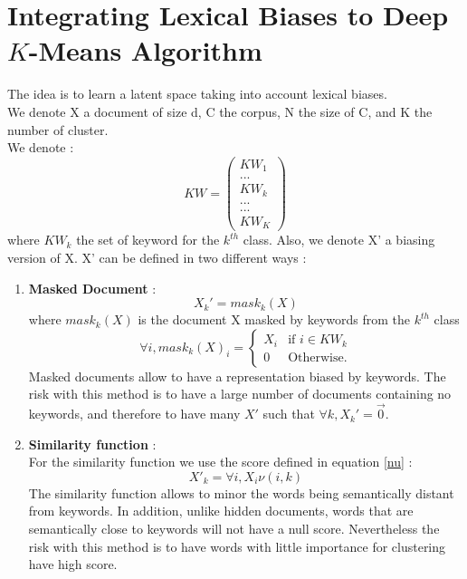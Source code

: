 \section{Integrating Lexical Biases to Deep $K$-Means Algorithm}\label{seq:proposed}
The idea is to learn a latent space taking into account lexical biases.
\\We denote  X a document of size d,
C the corpus, N the size of C, and K the number of cluster.
\\We denote :
\begin{equation}
KW = \begin{pmatrix}KW_1  \\ ... \\ KW_k \\ ...\\ ... \\ KW_{K}\end{pmatrix}
\end{equation}
where $KW_k$ the set of keyword for the $k^{th}$ class. Also, we denote X' a biasing
version of X. X' can be defined in two different ways :
\begin{enumerate}
\item \textbf{Masked Document} :
\begin{equation}
X_k' = mask_k(X) 
\end{equation}
where $mask_k(X)$ is the document X masked by keywords from the $k^{th}$ class
\begin{equation}
\forall i, mask_k(X)_i = \left\{
\begin{array}{ll}
  X_i & \mbox{if } i \in KW_k\\
  0 & \mbox{Otherwise.}
\end{array}
\right. 
\end{equation}
Masked documents allow to have a representation biased by keywords. The risk 
with this method is to have a large number of documents containing no keywords, 
and therefore to have many $X'$ such that $\forall k, X_k' = \vec 0$. 
\item \textbf{Similarity function} :
\\For the similarity function we use the score defined in equation \ref{nu} :
\begin{equation}
   X'_k = \forall i, X_i \nu(i,k) 
\end{equation}
The similarity function allows to minor the words being semantically distant 
from keywords. In addition, unlike hidden documents, words that are 
semantically close to keywords will not have a null score. Nevertheless the 
risk with this method is to have words with little importance for clustering 
have high score.
\end{enumerate}
